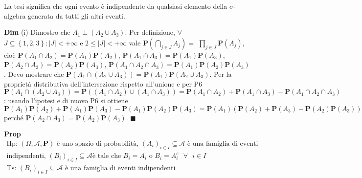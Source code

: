 \documentclass{article}
\begin{document}
La tesi significa che ogni evento \`{e} indipendente da qualsiasi elemento
della $\sigma $-algebra generata da tutti gli altri eventi.

\textbf{Dim} (i) Dimostro che $A_{1}\perp \left( A_{2}\cup A_{3}\right) $.
Per definizione, $\forall $ $J\subseteq \left\{ 1,2,3\right\} :\left\vert
J\right\vert <+\infty $ e $2\leq \left\vert J\right\vert <+\infty $ vale $%
\mathbf{P}\left( \bigcap_{j\in J}A_{j}\right) =$ $\prod_{j\in J}\mathbf{P}%
\left( A_{j}\right) $, cio\`{e} $\mathbf{P}\left( A_{1}\cap A_{2}\right) =%
\mathbf{P}\left( A_{1}\right) \mathbf{P}\left( A_{2}\right) $, $\mathbf{P}%
\left( A_{1}\cap A_{3}\right) =\mathbf{P}\left( A_{1}\right) \mathbf{P}%
\left( A_{3}\right) $, $\mathbf{P}\left( A_{2}\cap A_{3}\right) =\mathbf{P}%
\left( A_{2}\right) \mathbf{P}\left( A_{3}\right) $, $\mathbf{P}\left(
A_{1}\cap A_{2}\cap A_{3}\right) =\mathbf{P}\left( A_{1}\right) \mathbf{P}%
\left( A_{2}\right) \mathbf{P}\left( A_{3}\right) $. Devo mostrare che $%
\mathbf{P}\left( A_{1}\cap \left( A_{2}\cup A_{3}\right) \right) =\mathbf{P}%
\left( A_{1}\right) \mathbf{P}\left( A_{2}\cup A_{3}\right) $. Per la
propriet\`{a} distributiva dell'intersezione rispetto all'unione e per P6 $%
\mathbf{P}\left( A_{1}\cap \left( A_{2}\cup A_{3}\right) \right) =\mathbf{P}%
\left( \left( A_{1}\cap A_{2}\right) \cup \left( A_{1}\cap A_{3}\right)
\right) =\mathbf{P}\left( A_{1}\cap A_{2}\right) +\mathbf{P}\left( A_{1}\cap
A_{3}\right) -\mathbf{P}\left( A_{1}\cap A_{2}\cap A_{3}\right) $: usando
l'ipotesi e di nuovo P6 si ottiene $\mathbf{P}\left( A_{1}\right) \mathbf{P}%
\left( A_{2}\right) +\mathbf{P}\left( A_{1}\right) \mathbf{P}\left(
A_{3}\right) -\mathbf{P}\left( A_{1}\right) \mathbf{P}\left( A_{2}\right) 
\mathbf{P}\left( A_{3}\right) =\mathbf{P}\left( A_{1}\right) \left( \mathbf{P%
}\left( A_{2}\right) +\mathbf{P}\left( A_{3}\right) -\mathbf{P}\left(
A_{2}\right) \mathbf{P}\left( A_{3}\right) \right) =\mathbf{P}\left(
A_{1}\right) \mathbf{P}\left( A_{2}\cup A_{3}\right) $ perch\'{e} $\mathbf{P}%
\left( A_{2}\cap A_{3}\right) =\mathbf{P}\left( A_{2}\right) \mathbf{P}%
\left( A_{3}\right) $. $\blacksquare $

\textbf{Prop }%
\begin{gather*}
\text{Hp}\text{: }\left( \Omega ,\mathcal{A},\mathbf{P}\right) \text{ \`{e}
uno spazio di probabilit\`{a}, }\left( A_{i}\right) _{i\in I}\subseteq 
\mathcal{A}\text{ \`{e} una famiglia di eventi } \\
\text{indipendenti, }\left( B_{i}\right) _{i\in I}\subseteq \mathcal{A}\text{
\`{e} tale che }B_{i}=A_{i}\text{ o }B_{i}=A_{i}^{c}\text{ }\forall \text{ }%
i\in I\text{ } \\
\text{Ts}\text{: }\left( B_{i}\right) _{i\in I}\subseteq \mathcal{A}\text{ 
\`{e} una famiglia di eventi indipendenti}
\end{gather*}
\end{document}
